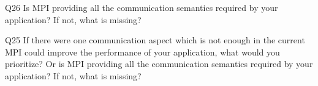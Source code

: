 \begin{description}%
\item{Q26} Is MPI providing all the communication semantics required by your application? If not, what is missing?%
\item{Q25} If there were one communication aspect which is not enough in the current MPI could improve the performance of your application, what would you prioritize? Or is MPI providing all the communication semantics required by your application? If not, what is missing?%
\end{description}%
